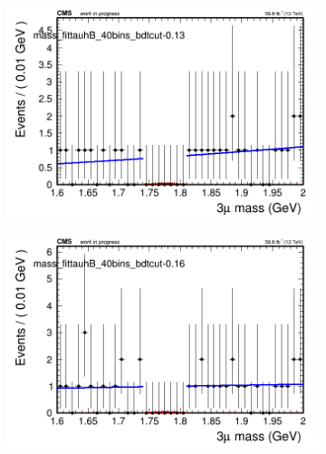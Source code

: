 \begin{figure}[H]
\begin{subfigure}{0.2\textwidth}
        \caption{}
    \end{subfigure}
    \begin{subfigure}{0.2\textwidth}
        \includegraphics[width=\textwidth]{power_law/plots/tauhB/massfit_tauhB_40bins_bdtcut-0.13.png}
        \caption{}
    \end{subfigure}
    \begin{subfigure}{0.2\textwidth}
        \includegraphics[width=\textwidth]{power_law/plots/tauhB/massfit_tauhB_40bins_bdtcut-0.16.png}
        \caption{}
    \end{subfigure}
    \begin{subfigure}{0.2\textwidth}

\end{subfigure}
\end{figure}
